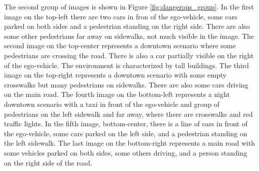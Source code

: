 The second group of images is shown in Figure \ref{fig:dangerous_group}. 
In the first image on the top-left there are two cars in fron of the ego-vehicle, 
some cars parked on both sides and a pedestrian standing on the right side. There 
are also some other pedestrians far away on sidewalks, not much visible in the 
image.
The second image on the top-center represents a downtown scenario where some 
pedestrians are crossing the road. There is also a car partially visible on the 
right of the ego-vehicle. The environment is characterized by tall buildings.
The third image on the top-right represents a downtown scenario with some 
empty crosswalks but many pedestrians on sidewalks. There are also some cars 
driving on the main road.
The fourth image on the bottom-left represents a night downtown scenario with a 
taxi in front of the ego-vehicle and group of pedestrians on the left sidewalk 
and far away, where there are crosswalks and red traffic lights.
In the fifth image, bottom-center, there is a line of cars in front of the 
ego-vehicle, some cars parked on the left side, and a pedestrian standing on the 
left sidewalk.
The last image on the bottom-right represents a main road with some vehicles 
parked on both sides, some others driving, and a person standing on the right 
side of the road.

